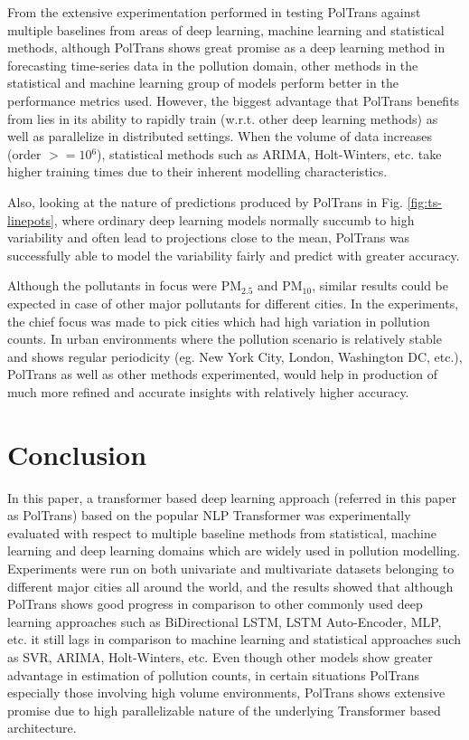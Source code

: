 \documentclass[10pt,journal]{IEEEtran}
\begin{document}
From the extensive experimentation performed in testing {PolTrans} against multiple baselines from areas of deep learning, machine learning and statistical methods, although {PolTrans} shows great promise as a deep learning method in forecasting time-series data in the pollution domain, other methods in the statistical and machine learning group of models perform better in the performance metrics used. However, the biggest advantage that {PolTrans} benefits from lies in its ability to rapidly train (w.r.t. other deep learning methods) as well as parallelize in distributed settings. When the volume of data increases (order ${>= 10{^{6}}}$), statistical methods such as ARIMA, Holt-Winters, etc. take higher training times due to their inherent modelling characteristics.

Also, looking at the nature of predictions produced by {PolTrans} in Fig. \ref{fig:ts-linepots}, where ordinary deep learning models normally succumb to high variability and often lead to projections close to the mean, {PolTrans} was successfully able to model the variability fairly and predict with greater accuracy.

Although the pollutants in focus were PM${_{2.5}}$ and PM${_{10}}$, similar results could be expected in case of other major pollutants for different cities. In the experiments, the chief focus was made to pick cities which had high variation in pollution counts. In urban environments where the pollution scenario is relatively stable and shows regular periodicity (eg. New York City, London, Washington DC, etc.), {PolTrans} as well as other methods experimented, would help in production of much more refined and accurate insights with relatively higher accuracy.

\section{Conclusion}
\label{sec:conclusion}

In this paper, a transformer based deep learning approach (referred in this paper as {PolTrans}) based on the popular NLP Transformer was experimentally evaluated with respect to multiple baseline methods from statistical, machine learning and deep learning domains which are widely used in pollution modelling. Experiments were run on both univariate and multivariate datasets belonging to different major cities all around the world, and the results showed that although {PolTrans} shows good progress in comparison to other commonly used deep learning approaches such as BiDirectional LSTM, LSTM Auto-Encoder, MLP, etc. it still lags in comparison to machine learning and statistical approaches such as SVR, ARIMA, Holt-Winters, etc. Even though other models show greater advantage in estimation of pollution counts, in certain situations {PolTrans} especially those involving high volume environments, {PolTrans} shows extensive promise due to high parallelizable nature of the underlying Transformer based architecture.
\end{document}
